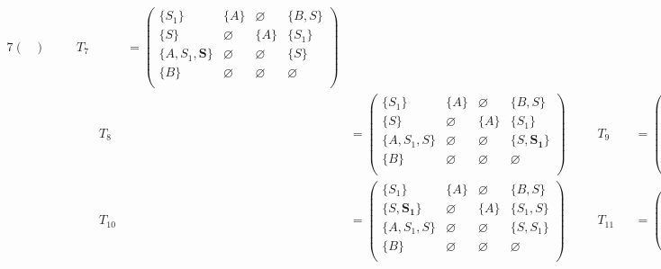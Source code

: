 \begin{example}
\begin{alignat*}{7}
\begin{pmatrix}
\end{pmatrix} \ \ \ \ &&T_7 &&= \begin{pmatrix}
\{S_1\}     & \{A\}       & \varnothing & \{B, S\}    \\
\{S\}       & \varnothing & \{A\}       & \{S_1\}     \\
\{A, S_1, \pmb{S}\}  & \varnothing & \varnothing & \{S\}    \\
\{B\}       & \varnothing & \varnothing & \varnothing \\
\end{pmatrix}  \\
& &&T_8 &&= \begin{pmatrix}
\{S_1\}     & \{A\}       & \varnothing & \{B, S\}    \\
\{S\}       & \varnothing & \{A\}       & \{S_1\}     \\
\{A, S_1, S\}  & \varnothing & \varnothing & \{S, \pmb{S_1}\} \\
\{B\}       & \varnothing & \varnothing & \varnothing \\
\end{pmatrix} \ \ \ \ &&T_9 &&= \begin{pmatrix}
\{S_1\}     & \{A\}       & \varnothing & \{B, S\}    \\
\{S\}       & \varnothing & \{A\}       & \{S_1, \pmb{S}\}     \\
\{A, S_1, S\}  & \varnothing & \varnothing & \{S, S_1\} \\
\{B\}       & \varnothing & \varnothing & \varnothing \\
\end{pmatrix} \\ & &&T_{10} &&= \begin{pmatrix}
\{S_1\}     & \{A\}       & \varnothing & \{B, S\}    \\
\{S, \pmb{S_1}\}       & \varnothing & \{A\}       & \{S_1, S\}     \\
\{A, S_1, S\}  & \varnothing & \varnothing & \{S, S_1\} \\
\{B\}       & \varnothing & \varnothing & \varnothing \\
\end{pmatrix}  \ \ \ \  &&T_{11} &&= \begin{pmatrix}
\{S_1, \pmb{S}\}     & \{A\}       & \varnothing & \{B, S\}    \\
\{S, S_1\}       & \varnothing & \{A\}       & \{S_1, S\}     \\
\{A, S_1, S\}  & \varnothing & \varnothing & \{S, S_1\} \\

\end{pmatrix}
\end{alignat*}
\end{example}
